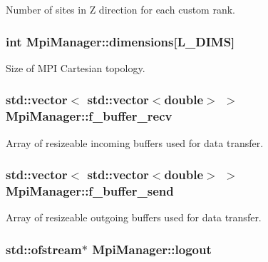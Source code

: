Number of sites in Z direction for each custom rank. 

\subsubsection[{\texorpdfstring{dimensions}{dimensions}}]{\setlength{\rightskip}{0pt plus 5cm}int Mpi\+Manager\+::dimensions\mbox{[}{\bf L\+\_\+\+D\+I\+MS}\mbox{]}}\hypertarget{class_mpi_manager_a8d486f77671328cdc139f6cef2a4006f}{}\label{class_mpi_manager_a8d486f77671328cdc139f6cef2a4006f}


Size of M\+PI Cartesian topology. 

\subsubsection[{\texorpdfstring{f\+\_\+buffer\+\_\+recv}{f_buffer_recv}}]{\setlength{\rightskip}{0pt plus 5cm}std\+::vector$<$ std\+::vector$<$double$>$ $>$ Mpi\+Manager\+::f\+\_\+buffer\+\_\+recv}\hypertarget{class_mpi_manager_ab8f1eeab50fd4812b3a51af1a6c43713}{}\label{class_mpi_manager_ab8f1eeab50fd4812b3a51af1a6c43713}


Array of resizeable incoming buffers used for data transfer. 

\subsubsection[{\texorpdfstring{f\+\_\+buffer\+\_\+send}{f_buffer_send}}]{\setlength{\rightskip}{0pt plus 5cm}std\+::vector$<$ std\+::vector$<$double$>$ $>$ Mpi\+Manager\+::f\+\_\+buffer\+\_\+send}\hypertarget{class_mpi_manager_aafbb74832f69a915927b9bf252bd971d}{}\label{class_mpi_manager_aafbb74832f69a915927b9bf252bd971d}


Array of resizeable outgoing buffers used for data transfer. 

\subsubsection[{\texorpdfstring{logout}{logout}}]{\setlength{\rightskip}{0pt plus 5cm}std\+::ofstream$\ast$ Mpi\+Manager\+::logout}\hypertarget{class_mpi_manager_a9a0dd93f57d78f568048197c95311832}{}\label{class_mpi_manager_a9a0dd93f57d78f568048197c95311832}


